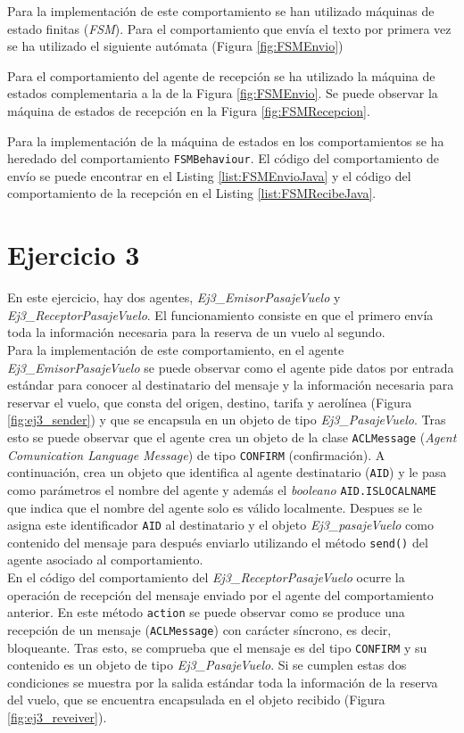\documentclass[10pt,a4paper]{article}
\begin{document}
Para la implementación de este comportamiento se han utilizado máquinas de estado finitas (\emph{FSM}). Para el comportamiento que envía el texto por primera vez se ha utilizado el siguiente autómata (Figura \ref{fig:FSMEnvio})

Para el comportamiento del agente de recepción se ha utilizado la máquina de estados complementaria a la de la Figura \ref{fig:FSMEnvio}. Se puede observar la máquina de estados de recepción en la Figura \ref{fig:FSMRecepcion}.

Para la implementación de la máquina de estados en los comportamientos se ha heredado del comportamiento \texttt{FSMBehaviour}. El código del comportamiento de envío se puede encontrar en el Listing \ref{list:FSMEnvioJava} y el código del comportamiento de la recepción en el Listing \ref{list:FSMRecibeJava}.


\section{Ejercicio 3}

En este ejercicio, hay dos agentes, \emph{Ej3\_EmisorPasajeVuelo} y \emph{Ej3\_ReceptorPasajeVuelo}. El funcionamiento consiste en que el primero envía toda la información necesaria para la reserva de un vuelo al segundo.\\

Para la implementación de este comportamiento, en el agente \emph{Ej3\_EmisorPasajeVuelo} se puede observar como el agente pide datos por entrada estándar para conocer al destinatario del mensaje y la información necesaria para reservar el vuelo, que consta del origen, destino, tarifa y aerolínea (Figura \ref{fig:ej3_sender}) y que se encapsula en un objeto de tipo \emph{Ej3\_PasajeVuelo}. Tras esto se puede observar que el agente crea un objeto de la clase \texttt{ACLMessage} (\emph{Agent Comunication Language Message}) de tipo \texttt{CONFIRM} (confirmación). A continuación, crea un objeto que identifica al agente destinatario (\texttt{AID}) y le pasa como parámetros el nombre del agente y además el \emph{booleano} \texttt{AID.ISLOCALNAME} que indica que el nombre del agente solo es válido localmente. Despues se le asigna este identificador \texttt{AID} al destinatario y el objeto \emph{Ej3\_pasajeVuelo} como contenido del mensaje para después enviarlo utilizando el método \texttt{send()} del agente asociado al comportamiento.\\

En el código del comportamiento del \emph{Ej3\_ReceptorPasajeVuelo} ocurre la operación de recepción del mensaje enviado por el agente del comportamiento anterior. En este método \texttt{action} se puede observar como se produce una recepción de un mensaje (\texttt{ACLMessage}) con carácter síncrono, es decir, bloqueante. Tras esto, se comprueba que el mensaje es del tipo \texttt{CONFIRM} y su contenido es un objeto de tipo \emph{Ej3\_PasajeVuelo}. Si se cumplen estas dos condiciones se muestra por la salida estándar toda la información de la reserva del vuelo, que se encuentra encapsulada en el objeto recibido (Figura \ref{fig:ej3_reveiver}). 
\end{document}
